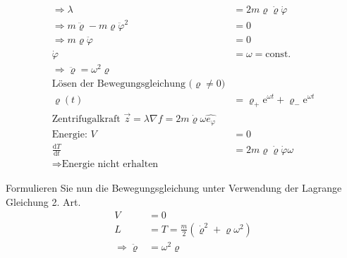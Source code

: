 \begin{enumeralph}
\begin{align*}
 \Rightarrow\lambda&=2m\varrho\dot{\varrho}\dot{\varphi}\\
 \Rightarrow m\ddot{\varrho}-m\varrho\ddot{\varphi}^2&=0\\
 \Rightarrow m\varrho\ddot{\varphi}&=0\\
 \dot{\varphi}&=\omega=\text{const.}\\
 \Rightarrow\ddot{\varrho}=\omega^2\varrho\\
 \text{Lösen der Bewegungsgleichung ($\varrho\neq0$)}\\
 \varrho(t)&=\varrho_+\mathrm{e}^{\omega t}+ \varrho_-\mathrm{e}^{\omega t}\\
 \text{Zentrifugalkraft }\overrightarrow{z}=\lambda\nabla f=2m\dot{\varrho}\omega\hat{e_\varphi}\\
 \text{Energie: }V&=0\\
 \frac{\mathrm{d}T}{\mathrm{d}t}&=2m\varrho\dot{\varrho}\dot{\varphi}\omega\\
 \Rightarrow \text{Energie nicht erhalten}
\end{align*}
\item Formulieren Sie nun die Bewegungsgleichung unter Verwendung der Lagrange Gleichung 2. Art.
\begin{align*}
V&=0\\
L&=T=\frac{m}{2}(\dot{\varrho}^2+\varrho\omega^2)\\
\Rightarrow \ddot{\varrho}&=\omega^2\varrho
\end{align*}
\end{enumeralph}

